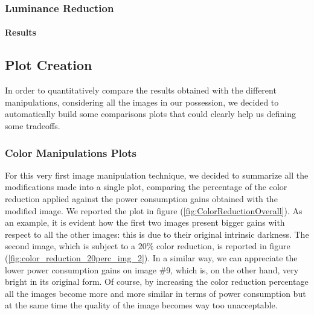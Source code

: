 \documentclass[a4paper]{article}
\begin{document}
        \subsubsection{Luminance Reduction}
            \paragraph{Results}

    \subsection{Plot Creation}
        In order to quantitatively compare the results obtained with the different manipulations, considering all the images in our possession, we decided to automatically build some comparisons plots that could clearly help us defining some tradeoffs.
        \subsubsection{Color Manipulations Plots}
            For this very first image manipulation technique, we decided to summarize all the modifications made into a single plot, comparing the percentage of the color reduction applied against the power consumption gains obtained with the modified image.
            We reported the plot in figure (\ref{fig:ColorReductionOverall}). As an example, it is evident how the first two images present bigger gains with respect to all the other images: this is due to their original intrinsic darkness. The second image, which is subject to a $20\%$ color reduction, is reported in figure (\ref{fig:color_reduction_20perc_img_2}). In a similar way, we can appreciate the lower power consumption gains on image \#9, which is, on the other hand, very bright in its original form. Of course, by increasing the color reduction percentage all the images become more and more similar in terms of power consumption but at the same time the quality of the image becomes way too unacceptable.
\end{document}
